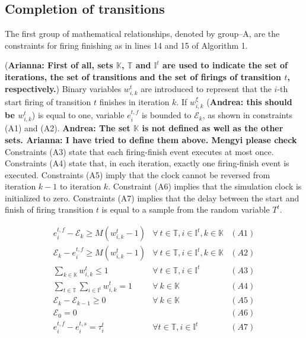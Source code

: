 \documentclass[suppldata]{interact}
\theoremstyle{plain}
\theoremstyle{definition}
\theoremstyle{remark}
\begin{document}
\subsection{Completion of transitions}

The first group of mathematical relationships, denoted by group--A, are the constraints for firing %
finishing as in lines 14 and 15 of Algorithm 1. 

(\textbf{Arianna: First of all, sets $\mathbb{K}$, $\mathbb{T}$ and $\mathbb{I}^t$ are used to indicate the set of iterations, the set of transitions and the set of firings of transition $t$, respectively.})
Binary variables $w^{t}_{i,k}$ are introduced to represent that the $i$-th start firing of transition $t$ finishes in iteration $k$. If $w^{\xi}_{i,k}$ (\textbf{Andrea: this should be $w^{t}_{i,k}$}) is equal to one, %
variable $e^{t,f}_{i}$ is bounded to $\mathcal{E}_k$, as shown in constraints (A1) and (A2). \textbf{Andrea: The set $\mathbb{K}$ is not defined as well as the other sets. Arianna: I have tried to define them above. Mengyi please check} Constraints (A3) state that each firing-finish event executes at most once. Constraints (A4) state that, in each iteration, exactly one firing-finish event is executed. Constraints (A5) imply that the clock cannot be reversed from iteration $k-1$ to iteration $k$. Constraint (A6) implies that the simulation clock is initialized to zero. Constraints (A7) implies that the delay between the start and finish of firing transition $t$ is equal to a sample from the random variable $T^{t}$.

\begin{eqnarray}
	e^{t,f}_i-\mathcal{E}_k\ge M(w^{t}_{i,k}-1) & \forall\ t\in\mathbb{T},i\in \mathbb{I}^{t},k\in \mathbb{K}&(A1)\nonumber\\
	\mathcal{E}_k-e^{t,f}_i\ge M(w^{t}_{i,k}-1) & \forall\ t\in\mathbb{T},i\in \mathbb{I}^{t},k\in \mathbb{K}&(A2)\nonumber\\
	\sum_{k\in \mathbb{K}} w^{t}_{i,k} \le 1& \forall\ t\in\mathbb{T},i\in \mathbb{I}^{t}&(A3)\nonumber\\
	\sum_{t\in \mathbb{T}}\sum_{i\in \mathbb{I}^{t}} w^{t}_{i,k} =1&\forall\ k\in \mathbb{K}&(A4)\nonumber\\
	\mathcal{E}_{k}-\mathcal{E}_{k-1}\ge 0&\forall\ k\in \mathbb{K}&(A5)\nonumber\\
	\mathcal{E}_0 = 0&&(A6)\nonumber\\
	e^{t,f}_{i} - e^{t,s}_{i} = \tau^{t}_{i} & \forall t\in\mathbb{T}, i\in \mathbb{I}^{t}&(A7) \nonumber
\end{eqnarray}
\end{document}
